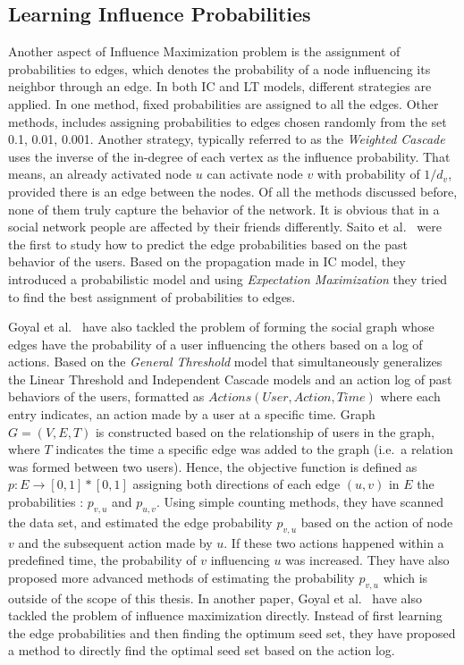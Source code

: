 \documentclass[english]{tktltiki}
\begin{document}
\subsection{Learning Influence Probabilities}
\label{subsec:learninginfprob}
Another aspect of Influence Maximization problem is the assignment of probabilities to edges, which denotes the probability of a node influencing its neighbor through an edge. 
In both IC and LT models, different strategies are applied. 
In one method, fixed probabilities are assigned to all the edges. 
Other methods, includes assigning probabilities to edges chosen randomly from the set {0.1, 0.01, 0.001}. 
Another strategy, typically referred to as the \textit{Weighted Cascade} uses the inverse of the in-degree of each vertex as the influence probability. 
That means, an already activated node $u$ can activate node $v$ with probability of $1/d_v$, provided there is an edge between the nodes. Of all the methods discussed before, none of them truly capture the behavior of the network. 
It is obvious that in a social network people are affected by their friends differently. 
Saito et al.\ \cite{saito08} were the first to study how to predict the edge probabilities based on the past behavior of the users. 
Based on the propagation made in IC model, they introduced a probabilistic model and using \textit{Expectation Maximization} they tried to find the best assignment of probabilities to edges.

Goyal et al.\ \cite{goyal10} have also tackled the problem of forming the social graph whose edges have the probability of a user influencing the others based on a log of actions. 
Based on the \textit{General Threshold} model that simultaneously generalizes the Linear Threshold and Independent Cascade models and an action log of past behaviors of the users, formatted as $Actions(User,Action, Time)$ where each entry indicates, an action made by a user at a specific time. 
Graph $G = (V,E,T)$ is constructed based on the relationship of users in the graph, where $T$ indicates the time a specific edge was added to the graph (i.e.\ a relation was formed between two users). 
Hence, the objective function is defined as $p : E \rightarrow [0,1] * [0,1]$ assigning both directions of each edge $(u,v)$ in $E$ the probabilities : $p_{v,u}$ and $p_{u,v}$.
Using simple counting methods, they have scanned the data set, and estimated the edge probability $p_{v,u}$ based on the action of node $v$ and the subsequent action made by $u$. 
If these two actions happened within a predefined time, the probability of $v$ influencing $u$ was increased. 
They have also proposed more advanced methods of estimating the probability $p_{v,u}$ which is outside of the scope of this thesis.
In another paper, Goyal et al.\ \cite{goyal11} have also tackled the problem of influence maximization directly. 
Instead of first learning the edge probabilities and then finding the optimum seed set, they have proposed a method to directly find the optimal seed set based on the action log.
\newpage
\end{document}
